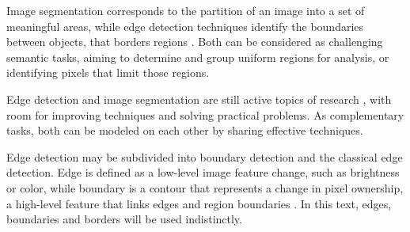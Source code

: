 


Image segmentation corresponds to the partition of an image into a set of meaningful areas, while edge detection techniques identify the boundaries between objects, that borders regions \cite{Dominguez:2016} \cite{gonzalez2002digital}.
Both can be considered as challenging semantic tasks, aiming to determine and group uniform regions for analysis, or identifying pixels that limit those regions.

Edge detection and image segmentation are still active topics of research \cite{Khan:2020} \cite{Sun:2022}, with room for improving techniques and solving practical problems.
As complementary tasks, both can be modeled on each other by sharing effective techniques.

Edge detection may be subdivided into boundary detection and the classical edge detection.
Edge is defined as a low-level image feature change, such as brightness or color, while boundary is a contour that represents a change in pixel ownership, a high-level feature that links edges and region boundaries \cite{MARTIN:1273918} \cite{Jain:1995}.
In this text, edges, boundaries and borders will be used indistinctly.

